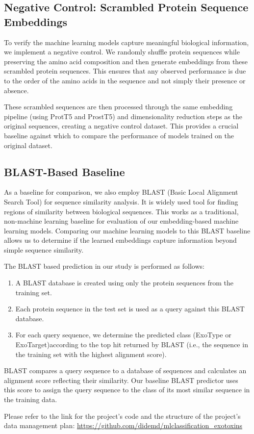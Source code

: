 \subsection{Negative Control: Scrambled Protein Sequence Embeddings}
\label{subsection:negative_control_scrambled_embeddings}

To verify the machine learning models capture meaningful biological information, we implement a negative control.
We randomly shuffle protein sequences while preserving the amino acid composition and then generate embeddings from these scrambled protein sequences.
This ensures that any observed performance is due to the order of the amino acids in the sequence and not simply their presence or absence.

These scrambled sequences are then processed through the same embedding pipeline (using \gls{ProtT5} and \gls{ProstT5}) and dimensionality reduction steps as the original sequences, creating a negative control dataset.
This provides a crucial baseline against which to compare the performance of models trained on the original dataset.


\subsection{BLAST-Based Baseline}
\label{subsubsection:blast_predictor}

As a baseline for comparison, we also employ BLAST (Basic Local Alignment Search Tool) \cite{Altschul1990} for sequence similarity analysis.
It is widely used tool for finding regions of similarity between biological sequences.
This works as a traditional, non-machine learning baseline for evaluation of our embedding-based machine learning models.
Comparing our machine learning models to this \gls{BLAST} baseline allows us to determine if the learned embeddings capture information beyond simple sequence similarity.

The  \gls{BLAST} based prediction in our study is performed as follows:

\begin{enumerate}
	\item A \gls{BLAST} database is created using only the protein sequences from the training set.
	
	\item Each protein sequence in the test set is used as a query against this \gls{BLAST} database.
	
	\item For each query sequence, we determine the predicted class (ExoType or ExoTarget)according to the top hit returned by \gls{BLAST} (i.e., the sequence in the training set with the highest alignment score).
\end{enumerate}

\gls{BLAST} compares a query sequence to a database of sequences and calculates an alignment score reflecting their similarity.
Our baseline \gls{BLAST} predictor uses this score to assign the query sequence to the class of its most similar sequence in the training data.

Please refer to the link for the project's code and the structure of the project's data management plan: \url{https://github.com/didemd/mlclassification_exotoxins}
